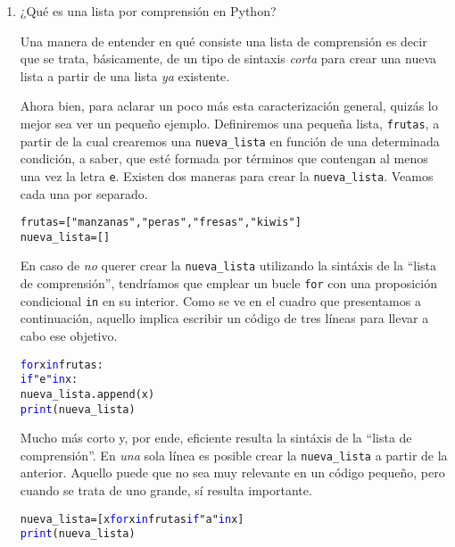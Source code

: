 \documentclass{article}
\begin{document}
\begin{enumerate}
\item ¿Qué es una lista por comprensión en Python?
\par \hspace{5pt} Una manera de entender en qué consiste una lista de comprensión es decir que se trata, básicamente, de un tipo de sintaxis \emph{corta} para crear una nueva lista a partir de una lista \emph{ya} existente.
\par \hspace{5pt} Ahora bien, para aclarar un poco más esta caracterización general, quizás lo mejor sea ver un pequeño ejemplo. Definiremos una pequeña lista, \verb|frutas|, a partir de la cual crearemos una \verb|nueva_lista| en función de una determinada condición, a saber, que esté formada por términos que contengan al menos una vez la letra \verb|e|. Existen dos maneras para crear la \verb|nueva_lista|. Veamos cada una por separado.
\begin{tcolorbox}
\begin{alltt}
frutas = ["manzanas", "peras", "fresas", "kiwis"]
nueva_lista = [ ]
\end{alltt}        
\end{tcolorbox} 
\par \hspace{5pt} En caso de \emph{no} querer crear la \verb|nueva_lista| utilizando la sintáxis de la ``lista de comprensión'', tendríamos que emplear un bucle \verb|for| con una proposición condicional \verb|in| en su interior. Como se ve en el cuadro que presentamos a continuación, aquello implica escribir un código de tres líneas para llevar a cabo ese objetivo.
\begin{tcolorbox}
\begin{alltt}
\textcolor{blue}{for} x \textcolor{blue}{in} frutas:
  \textcolor{blue}{if} "e" \textcolor{blue}{in} x:
    nueva_lista.append(x)
\textcolor{blue}{print}(nueva_lista)
\end{alltt}        
\end{tcolorbox}
 Mucho más corto y, por ende, eficiente resulta la sintáxis de la ``lista de comprensión''. En \emph{una} sola línea es posible crear la \verb|nueva_lista| a partir de la anterior. Aquello puede que no sea muy relevante en un código pequeño, pero cuando se trata de uno grande, sí resulta importante.
\begin{tcolorbox}
\begin{alltt}
nueva_lista = [x \textcolor{blue}{for} x \textcolor{blue}{in} frutas \textcolor{blue}{if} "a" \textcolor{blue}{in} x]
\textcolor{blue}{print}(nueva_lista)
\end{alltt}        
\end{tcolorbox}
\vspace{0.5cm}
  

\end{enumerate}
\end{document}

